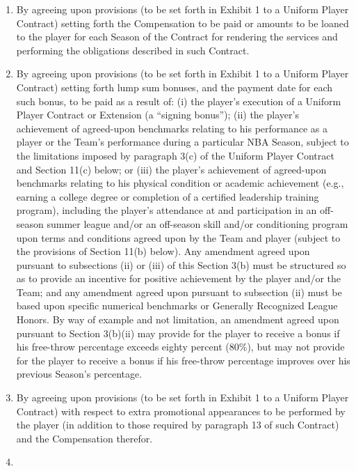 \documentclass[
]{book}
\providecommand{\tightlist}{%
  \setlength{\itemsep}{0pt}\setlength{\parskip}{0pt}}
\begin{document}
\begin{enumerate}
\def\labelenumi{(\alph{enumi})}
\tightlist
\item
  By agreeing upon provisions (to be set forth in Exhibit 1 to a Uniform Player Contract) setting forth the Compensation to be paid or amounts to be loaned to the player for each Season of the Contract for rendering the services and performing the obligations described in such Contract.
\item
  By agreeing upon provisions (to be set forth in Exhibit 1 to a Uniform Player Contract) setting forth lump sum bonuses, and the payment date for each such bonus, to be paid as a result of: (i) the player's execution of a Uniform Player Contract or Extension (a ``signing bonus''); (ii) the player's achievement of agreed-upon benchmarks relating to his performance as a player or the Team's performance during a particular NBA Season, subject to the limitations imposed by paragraph 3(c) of the Uniform Player Contract and Section 11(c) below; or (iii) the player's achievement of agreed-upon benchmarks relating to his physical condition or academic achievement (e.g., earning a college degree or completion of a certified leadership training program), including the player's attendance at and participation in an off-season summer league and/or an off-season skill and/or conditioning program upon terms and conditions agreed upon by the Team and player (subject to the provisions of Section 11(b) below). Any amendment agreed upon pursuant to subsections (ii) or (iii) of this Section 3(b) must be structured so as to provide an incentive for positive achievement by the player and/or the Team; and any amendment agreed upon pursuant to subsection (ii) must be based upon specific numerical benchmarks or Generally Recognized League Honors. By way of example and not limitation, an amendment agreed upon pursuant to Section 3(b)(ii) may provide for the player to receive a bonus if his free-throw percentage exceeds eighty percent (80\%), but may not provide for the player to receive a bonus if his free-throw percentage improves over his previous Season's percentage.
\item
  By agreeing upon provisions (to be set forth in Exhibit 1 to a Uniform Player Contract) with respect to extra promotional appearances to be performed by the player (in addition to those required by paragraph 13 of such Contract) and the Compensation therefor.
\item

\end{enumerate}
\end{document}
